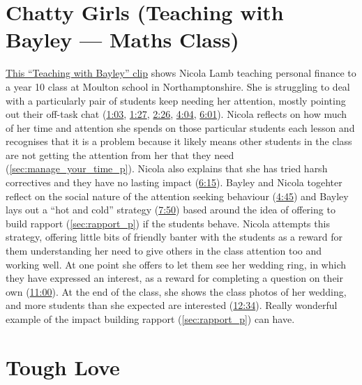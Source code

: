 \documentclass[12pt]{report}
\begin{document}
\begin{appendices}
\section{Chatty Girls (Teaching with Bayley --- Maths Class)}
\label{video:6}


\href{https://www.youtube.com/watch?v=Q3OxKAxpOdo}{This ``Teaching with Bayley'' clip} shows Nicola Lamb teaching personal finance to a year 10 class at Moulton school in Northamptonshire. She is struggling to deal with a particularly pair of students keep needing her attention, mostly pointing out their off-task chat (\href{https://www.youtube.com/watch?v=Q3OxKAxpOdo&t=63}{1:03}, \href{https://www.youtube.com/watch?v=Q3OxKAxpOdo&t=87}{1:27}, \href{https://www.youtube.com/watch?v=Q3OxKAxpOdo&t=146}{2:26}, \href{https://www.youtube.com/watch?v=Q3OxKAxpOdo&t=244}{4:04}, \href{https://www.youtube.com/watch?v=Q3OxKAxpOdo&t=361}{6:01}). Nicola reflects on how much of her time and attention she spends on those particular students each lesson and recognises that it is a problem because it likely means other students in the class are not getting the attention from her that they need (\ref{sec:manage_your_time_p}). Nicola also explains that she has tried harsh correctives and they have no lasting impact (\href{https://www.youtube.com/watch?v=Q3OxKAxpOdo&t=375}{6:15}). Bayley and Nicola togehter reflect on the social nature of the attention seeking behaviour (\href{https://www.youtube.com/watch?v=Q3OxKAxpOdo&t=285}{4:45}) and Bayley lays out a ``hot and cold'' strategy (\href{https://www.youtube.com/watch?v=Q3OxKAxpOdo&t=470}{7:50}) based around the idea of offering to build rapport (\ref{sec:rapport_p}) if the students behave. Nicola attempts this strategy, offering little bits of friendly banter with the students as a reward for them understanding her need to give others in the class attention too and working well. At one point she offers to let them see her wedding ring, in which they have expressed an interest, as a reward for completing a question on their own (\href{https://www.youtube.com/watch?v=Q3OxKAxpOdo&t=660}{11:00}). At the end of the class, she shows the class photos of her wedding, and more students than she expected are interested (\href{https://www.youtube.com/watch?v=Q3OxKAxpOdo&t=754}{12:34}). Really wonderful example of the impact building rapport (\ref{sec:rapport_p}) can have.





\section{Tough Love}
\label{video:7}



\end{appendices}
\end{document}
